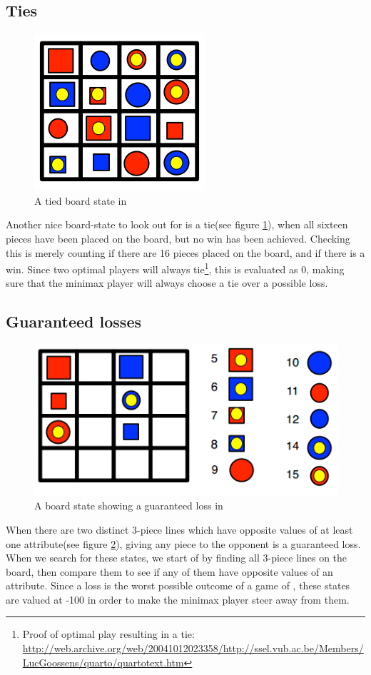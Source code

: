 \subsection{Ties}
\begin{figure}[htb]
\includegraphics{pictures/tie.png}
\caption[A tie in \quarto{}]{A tied board state in \quarto{}}
\label{fig:tie}
\end{figure}
Another nice board-state to look out for is a tie(see figure \ref{fig:tie}), 
when all sixteen pieces have 
been placed on the board, but no win has been achieved. Checking this is merely 
counting if there are 16 pieces placed on the board, and if there is a  win. 
Since two optimal players will always tie\footnote{Proof of optimal play 
resulting in a tie: \url{http://web.archive.org/web/20041012023358/http://ssel.vub.ac.be/Members/LucGoossens/quarto/quartotext.htm}}, 
this is evaluated as 0, making sure that the minimax player will always 
choose a tie over a possible loss.

\subsection{Guaranteed losses}
\begin{figure}[htb]
\includegraphics{pictures/gloss.png}
\caption[A guaranteed loss in \quarto{}]{A board state showing a guaranteed loss in \quarto{}}
\label{fig:gloss}
\end{figure}
When there are two distinct 3-piece lines which have opposite values of at least 
one attribute(see figure \ref{fig:gloss}), 
giving any piece to the opponent is a  guaranteed loss.
When we search for these states, we start of by finding all 3-piece lines on the 
board, then compare them to see if any of them have opposite values of an attribute.
Since a loss is the worst possible outcome of a game of \quarto{}, these states 
are valued at -100 in order to make the minimax player steer away from them.

